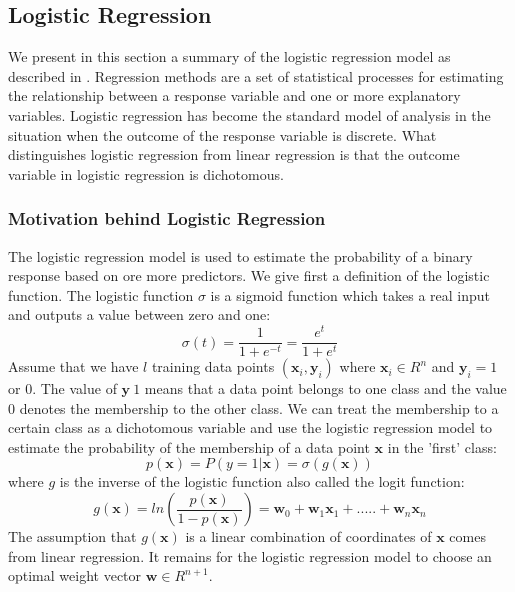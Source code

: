 \documentclass[a4paper,11pt,oneside]{article}
\begin{document}
\subsection{Logistic Regression}\label{logistic}
We present in this section a summary of the logistic regression model as described in \cite{hosmer2013applied}.
Regression methods are a set of statistical processes for estimating the relationship between a response variable
and one or more explanatory variables. Logistic regression has become the standard model of analysis in the situation when the outcome of the response variable
is discrete. What distinguishes logistic regression from linear regression is that the outcome variable in logistic regression 
is dichotomous. 
\subsubsection*{Motivation behind Logistic Regression}
The logistic regression model is used to estimate the probability of a binary response based on ore more predictors.
We give first a definition of the logistic function. The logistic function $\sigma$ is a sigmoid function which takes a real input
and outputs a value between zero and one:
\begin{equation}
  \sigma(t) = \frac{1}{1+e^{-t}} = \frac{e^t}{1+e^t}
\end{equation}
Assume that we have $l$ training data points $(\mathbf{x}_i,\mathbf{y}_i)$ where
$\mathbf{x}_i \in R^n$ and $\mathbf{y}_i=1$ or $0$. The value of $\mathbf{y}\ 1$  means that a data point belongs to one 
class and the value $0$ denotes the membership to the other class. We can treat the membership to a certain class
as a dichotomous variable and use the logistic regression model to estimate the probability of the membership of a
data point $\mathbf{x}$ in the 'first' class:
\begin{equation}
  p(\mathbf{x}) = P(y=1|\mathbf{x}) = \sigma(g(\mathbf{x}))
\end{equation}
where $g$ is the inverse of the logistic function also called the logit function:
\begin{equation}
  g(\mathbf{x}) = ln(\frac{p(\mathbf{x})}{1-p(\mathbf{x})}) = \mathbf{w}_0+\mathbf{w}_1\mathbf{x}_1+.....+\mathbf{w}_n\mathbf{x}_n
\end{equation}
The assumption that $g(\mathbf{x})$ is a linear combination of coordinates of $\mathbf{x}$ comes from linear regression.
It remains for the logistic regression model to choose an optimal weight vector $\mathbf{w}\in R^{n+1}$. 
\end{document}
